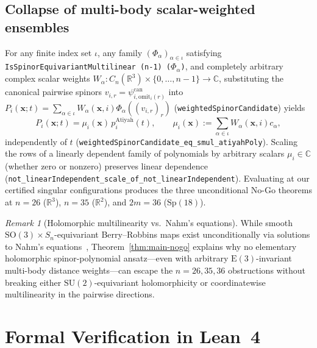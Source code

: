 \documentclass[11pt,reqno]{amsart}
\theoremstyle{remark}
\newtheorem{remark}[theorem]{Remark}
\newcommand{\R}{\mathbb{R}}
\newcommand{\C}{\mathbb{C}}
\begin{document}
\subsection{Collapse of multi-body scalar-weighted ensembles}
For any finite index set $\iota$, any family $(\Phi_\alpha)_{\alpha \in \iota}$ satisfying \texttt{IsSpinor\allowbreak Equivariant\allowbreak Multilinear (n-1) ($\Phi_\alpha$)}, and completely arbitrary complex scalar weights $W_\alpha : C_n(\R^3) \times \{0, \dots, n - 1\} \to \C$, substituting the canonical pairwise spinors $v_{i,r} = \psi^{\mathrm{can}}_{i, \mathrm{omit}_i(r)}$ into $P_i(\mathbf{x}; t) = \sum_{\alpha \in \iota} W_\alpha(\mathbf{x}, i) \Phi_\alpha((v_{i,r})_r)$ (\texttt{weightedSpinorCandidate}) yields
\[
  P_i(\mathbf{x}; t) = \mu_i(\mathbf{x})\, p_i^{\mathrm{Atiyah}}(t), \qquad \mu_i(\mathbf{x}) := \sum_{\alpha \in \iota} W_\alpha(\mathbf{x}, i) c_\alpha,
\]
independently of $t$ (\texttt{weightedSpinorCandidate\_eq\_smul\_atiyahPoly}).
Scaling the rows of a linearly dependent family of polynomials by arbitrary scalars $\mu_i \in \C$ (whether zero or nonzero) preserves linear dependence (\texttt{not\_linearIndependent\_scale\_of\_not\_linearIndependent}).
Evaluating at our certified singular configurations produces the three unconditional No-Go theorems at $n = 26$ ($\mathbb{R}^3$), $n = 35$ ($\mathbb{R}^2$), and $2m = 36$ ($\mathrm{Sp}(18)$).

\begin{remark}[Holomorphic multilinearity vs.\ Nahm's equations]
While smooth $\mathrm{SO}(3) \times S_n$-equivariant Berry--Robbins maps exist unconditionally via solutions to Nahm's equations~\cite{AtiyahBielawski2002}, Theorem~\ref{thm:main-nogo} explains why no elementary holomorphic spinor-polynomial ansatz---even with arbitrary $\mathrm{E}(3)$-invariant multi-body distance weights---can escape the $n = 26, 35, 36$ obstructions without breaking either $\mathrm{SU}(2)$-equivariant holomorphicity or coordinatewise multilinearity in the pairwise directions.
\end{remark}

\section{Formal Verification in Lean~4}
\end{document}
